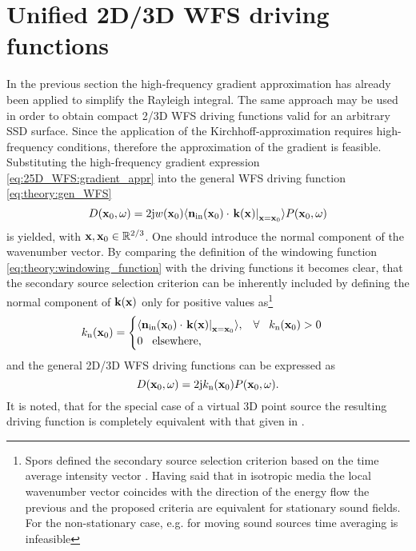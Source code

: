 \section{Unified 2D/3D WFS driving functions}
In the previous section the high-frequency gradient approximation has already been applied to simplify the Rayleigh integral.
The same approach may be used in order to obtain compact 2/3D WFS driving functions valid for an arbitrary SSD surface.
Since the application of the Kirchhoff-approximation requires high-frequency conditions, therefore the approximation of the gradient is feasible.
Substituting the high-frequency gradient expression \eqref{eq:25D_WFS:gradient_appr} into the general WFS driving function \eqref{eq:theory:gen_WFS}
\begin{equation}
D(\mathbf{x}_0,\omega) = 2\mathrm{j} w(\mathbf{x}_0) \langle \mathbf{n}_{\mathrm{in}}(\mathbf{x}_0) \cdot \left.
\mathbf{k}(\mathbf{x})\right|_{\mathbf{x} = \mathbf{x}_0}\rangle P(\mathbf{x}_0,\omega)
\end{equation}
is yielded, with $\mathbf{x}, \mathbf{x}_0 \in \mathbb{R}^{2/3}$.
One should introduce the normal component of the wavenumber vector.
By comparing the definition of the windowing function \eqref{eq:theory:windowing_function} with the driving functions it becomes clear, that the secondary source selection criterion can be inherently included by defining the normal component of $\mathbf{k}(\mathbf{x})$ only for positive values as\footnote{Spors defined the secondary source selection criterion based on the time average intensity vector \cite{Spors2007:DAGA:SS_selection_criterion, Spors2007}.
Having said that in isotropic media the local wavenumber vector coincides with the direction of the energy flow the previous and the proposed criteria are equivalent for stationary sound fields.
For the non-stationary case, e.g.
for moving sound sources time averaging is infeasible}
\begin{equation}
k_\mathrm{n}(\mathbf{x}_0) = \begin{cases}
						\langle \mathbf{n}_{\mathrm{in}}(\mathbf{x}_0) \cdot \left.
\mathbf{k}(\mathbf{x})\right|_{\mathbf{x} = \mathbf{x}_0}\rangle, \hspace{3mm} \forall \hspace{3mm} k_\mathrm{n}(\mathbf{x}_0) > 0 \\
						0  \hspace{3mm} \text{elsewhere},
					\end{cases}
\label{eq:25D_WFS:normal_k}
\end{equation}
and the general 2D/3D WFS driving functions can be expressed as
\begin{equation}
D(\mathbf{x}_0,\omega) = 2\mathrm{j}k_\mathrm{n}(\mathbf{x}_0)  P(\mathbf{x}_0,\omega).
\label{eq:25D_WFS:generalized_2d_3d_wfs}
\end{equation}
It is noted, that for the special case of a virtual 3D point source the resulting driving function is completely equivalent with that given in \cite[Eq.(20)]{Zotter2013:uniqueness}.	


